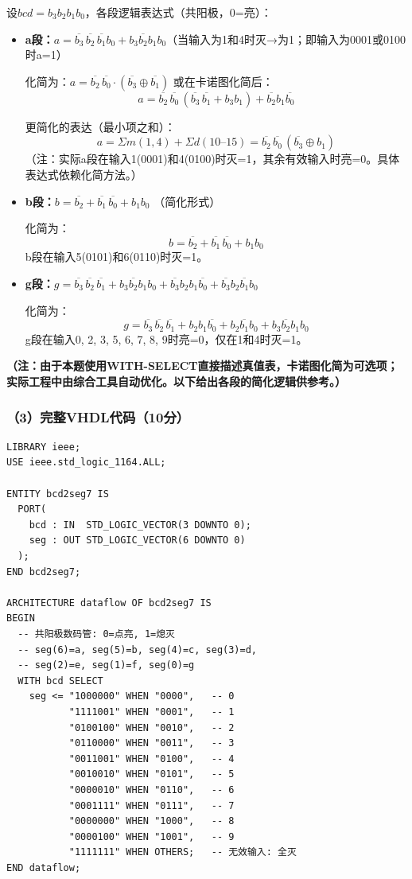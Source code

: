 设$bcd = b_3b_2b_1b_0$，各段逻辑表达式（共阳极，0=亮）：

\begin{itemize}
\item \textbf{a段：}$a = \overline{b_3}\,\overline{b_2}\,\overline{b_1}b_0 + b_3\overline{b_2}b_1b_0$（当输入为1和4时灭→为1；即输入为0001或0100时a=1）

  化简为：$a = \overline{b_2}\,\overline{b_0} \cdot (\overline{b_3} \oplus \overline{b_1})$ 或在卡诺图化简后：
  $$a = \overline{b_2}\,\overline{b_0}\,(\overline{b_3}\,\overline{b_1} + b_3 b_1) + \overline{b_2}b_1\overline{b_0}$$

  更简化的表达（最小项之和）：
  $$a = \Sigma m(1, 4) + \Sigma d(10\text{--}15) = \overline{b_2}\,\overline{b_0}\,(\overline{b_3}\oplus b_1)$$
  （注：实际a段在输入1(0001)和4(0100)时灭=1，其余有效输入时亮=0。具体表达式依赖化简方法。）

\item \textbf{b段：}$b = \overline{b_2} + \overline{b_1}\,\overline{b_0} + b_1 b_0$ （简化形式）

  化简为：
  $$b = \overline{b_2} + \overline{b_1}\,\overline{b_0} + b_1 b_0$$
  b段在输入5(0101)和6(0110)时灭=1。

\item \textbf{g段：}$g = \overline{b_3}\,\overline{b_2}\,\overline{b_1} + b_3\overline{b_2}b_1b_0 + \overline{b_3}b_2b_1\overline{b_0} + \overline{b_3}b_2\overline{b_1}b_0$

  化简为：
  $$g = \overline{b_3}\,\overline{b_2}\,\overline{b_1} + b_2b_1\overline{b_0} + b_2\overline{b_1}b_0 + b_3\overline{b_2}b_1b_0$$
  g段在输入0, 2, 3, 5, 6, 7, 8, 9时亮=0，仅在1和4时灭=1。
\end{itemize}

\textbf{（注：由于本题使用WITH-SELECT直接描述真值表，卡诺图化简为可选项；实际工程中由综合工具自动优化。以下给出各段的简化逻辑供参考。）}

\subsubsection{（3）完整VHDL代码（10分）}

\begin{lstlisting}[language=VDL, caption={BCD—7段译码器——数据流描述方式}]
LIBRARY ieee;
USE ieee.std_logic_1164.ALL;

ENTITY bcd2seg7 IS
  PORT(
    bcd : IN  STD_LOGIC_VECTOR(3 DOWNTO 0);
    seg : OUT STD_LOGIC_VECTOR(6 DOWNTO 0)
  );
END bcd2seg7;

ARCHITECTURE dataflow OF bcd2seg7 IS
BEGIN
  -- 共阳极数码管: 0=点亮, 1=熄灭
  -- seg(6)=a, seg(5)=b, seg(4)=c, seg(3)=d,
  -- seg(2)=e, seg(1)=f, seg(0)=g
  WITH bcd SELECT
    seg <= "1000000" WHEN "0000",   -- 0
           "1111001" WHEN "0001",   -- 1
           "0100100" WHEN "0010",   -- 2
           "0110000" WHEN "0011",   -- 3
           "0011001" WHEN "0100",   -- 4
           "0010010" WHEN "0101",   -- 5
           "0000010" WHEN "0110",   -- 6
           "0001111" WHEN "0111",   -- 7
           "0000000" WHEN "1000",   -- 8
           "0000100" WHEN "1001",   -- 9
           "1111111" WHEN OTHERS;   -- 无效输入: 全灭
END dataflow;
\end{lstlisting}

